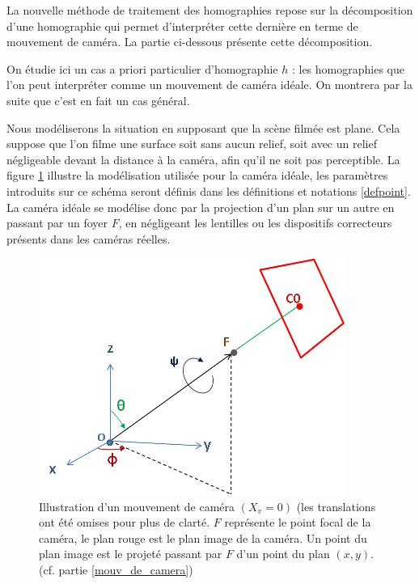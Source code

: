 La nouvelle méthode de traitement des homographies repose sur la décomposition d'une homographie qui permet d'interpréter cette dernière en terme de mouvement de caméra. La partie ci-dessous présente cette décomposition.

\label{mouv_de_camera}
On étudie ici un cas a priori particulier d'homographie $h$ : les homographies que l'on peut interpréter comme un mouvement de caméra idéale. On montrera par la suite que c'est en fait un cas général.

Nous modéliserons la situation en supposant que la scène filmée est plane. Cela suppose que l'on filme une surface soit sans aucun relief, soit avec un relief négligeable devant la distance à la caméra, afin qu'il ne soit pas perceptible. La figure \ref{shmdecomp} illustre la modélisation utilisée pour la caméra idéale, les paramètres introduits sur ce schéma seront définis dans les définitions et notations \ref{defpoint}. La caméra idéale se modélise donc par la projection d'un plan sur un autre en passant par un foyer $F$, en négligeant les lentilles ou les dispositifs correcteurs présents dans les caméras réelles.

\begin{figure}[h!]

\centering
\includegraphics[width=10cm]{shema_decomp.png}
\caption{Illustration d'un mouvement de caméra $(X_v =0)$ (les translations ont été omises pour plus de clarté. $F$ représente le point focal de la caméra, le plan rouge est le plan image de la caméra. Un point du plan image est le projeté passant par $F$ d'un point du plan $(x,y)$. (cf. partie \ref{mouv_de_camera})}
\label{shmdecomp}
\end{figure}



